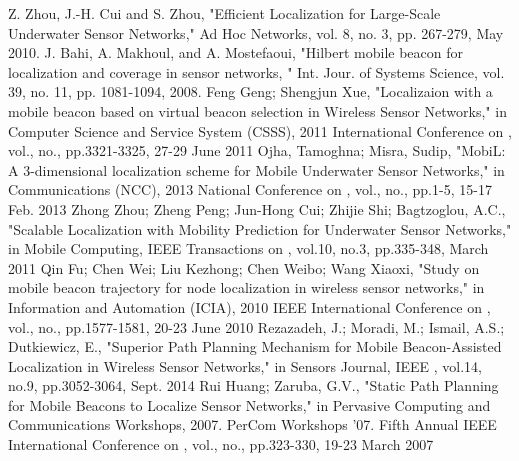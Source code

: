 \documentclass[conference]{IEEEtran}
\begin{document}
%
%
%
\begin{thebibliography}{1}

Z. Zhou, J.-H. Cui and S. Zhou, "Efficient Localization for Large-Scale Underwater Sensor Networks," Ad Hoc Networks, vol. 8, no. 3, pp. 267-279, May 2010.
J. Bahi, A. Makhoul, and A. Mostefaoui, "Hilbert mobile beacon for localization and coverage in sensor networks, " Int. Jour. of Systems Science, vol. 39, no. 11, pp. 1081-1094, 2008. 
Feng Geng; Shengjun Xue, "Localizaion with a mobile beacon based on virtual beacon selection in Wireless Sensor Networks," in Computer Science and Service System (CSSS), 2011 International Conference on , vol., no., pp.3321-3325, 27-29 June 2011
Ojha, Tamoghna; Misra, Sudip, "MobiL: A 3-dimensional localization scheme for Mobile Underwater Sensor Networks," in Communications (NCC), 2013 National Conference on , vol., no., pp.1-5, 15-17 Feb. 2013
Zhong Zhou; Zheng Peng; Jun-Hong Cui; Zhijie Shi; Bagtzoglou, A.C., "Scalable Localization with Mobility Prediction for Underwater Sensor Networks," in Mobile Computing, IEEE Transactions on , vol.10, no.3, pp.335-348, March 2011
Qin Fu; Chen Wei; Liu Kezhong; Chen Weibo; Wang Xiaoxi, "Study on mobile beacon trajectory for node localization in wireless sensor networks," in Information and Automation (ICIA), 2010 IEEE International Conference on , vol., no., pp.1577-1581, 20-23 June 2010
Rezazadeh, J.; Moradi, M.; Ismail, A.S.; Dutkiewicz, E., "Superior Path Planning Mechanism for Mobile Beacon-Assisted Localization in Wireless Sensor Networks," in Sensors Journal, IEEE , vol.14, no.9, pp.3052-3064, Sept. 2014
Rui Huang; Zaruba, G.V., "Static Path Planning for Mobile Beacons to Localize Sensor Networks," in Pervasive Computing and Communications Workshops, 2007. PerCom Workshops '07. Fifth Annual IEEE International Conference on , vol., no., pp.323-330, 19-23 March 2007

\end{thebibliography}
\end{document}
